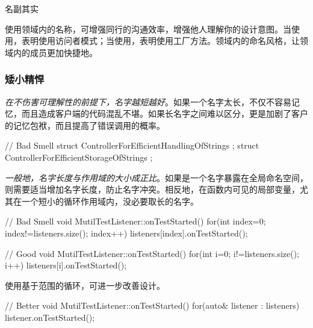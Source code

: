 \begin{content}
\begin{episode}{名副其实}
\begin{content}
使用领域内的名称，可增强同行的沟通效率，增强他人理解你的设计意图。当使用，表明使用访问者模式；当使用，表明使用工厂方法。领域内的命名风格，让领域内的成员更加快捷地。

\begin{enum}
\end{enum}

\subsubsection{矮小精悍}

\emph{在不伤害可理解性的前提下，名字越短越好}。如果一个名字太长，不仅不容易记忆，而且造成客户端的代码混乱不堪。如果长名字之间难以区分，更是加剧了客户的记忆包袱，而且提高了错误调用的概率。

\begin{c++}[title={\ttfamily{坏味道：冗长，难以区分}}]
// Bad Smell
struct ControllerForEfficientHandlingOfStrings {};
struct ControllerForEfficientStorageOfStrings {};
\end{c++}

\emph{一般地，名字长度与作用域的大小成正比}。如果是一个名字暴露在全局命名空间，则需要适当增加名字长度，防止名字冲突。相反地，在函数内可见的局部变量，尤其在一个短小的循环作用域内，没必要取长的名字。

 \begin{c++}[title={\ttfamily{坏味道：使用index命名循环变量}}]
// Bad Smell
void MutilTestListener::onTestStarted() {
  for(int index=0; index!=listeners.size(); index++) {
    listeners[index].onTestStarted();
  }
}
 \end{c++} 

 \begin{c++}[title={\ttfamily{重构：使用i命名循环变量}}]
// Good
void MutilTestListener::onTestStarted() {
  for(int i=0; i!=listeners.size(); i++) {
    listeners[i].onTestStarted();
  }
}
 \end{c++} 

使用基于范围的循环，可进一步改善设计。

\begin{c++}[title={\ttfamily{重构：基于范围的\ascii{for}循环}}]
// Better
void MutilTestListener::onTestStarted() {
  for(auto& listener : listeners) {
    listener.onTestStarted();
  }
}
\end{c++}


\end{content}
\end{episode}
\end{content}
